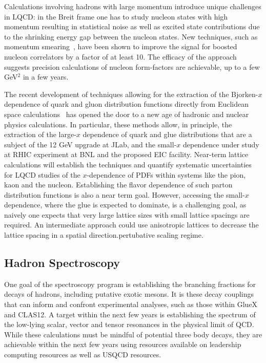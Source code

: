 Calculations involving hadrons with large momentum introduce unique challenges in LQCD: in the Breit frame one 
has to study nucleon states with high momentum 
resulting in statistical noise as well as excited state contributions due to the
shrinking energy gap between the nucleon states.
New techniques, such as momentum smearing~\cite{Bali:2016lva,Syritsyn:2017jrc}, have been shown to improve
the signal for boosted nucleon correlators by a factor of at least 10. The efficacy of the approach suggests precision calculations of nucleon form-factors are achievable, up to a few GeV$^2$ in a few years.

The recent development of techniques allowing for the extraction of the Bjorken-$x$ dependence of quark and gluon distribution functions directly from Euclidean space calculations~\cite{Ji:2001wha} has opened the door to a new age of hadronic and nuclear physics calculations. In particular, these methods allow, in principle,  the extraction of the large-$x$ dependence of quark and glue distributions that are a subject of the 12 GeV upgrade at JLab, and the small-$x$ dependence under study at RHIC experiment at BNL and the proposed EIC facility. Near-term  lattice calculations will establish the techniques and quantify systematic uncertainties for LQCD studies of the $x$-dependence of PDFs within systems like the pion, kaon and the nucleon. Establishing the flavor dependence of such parton distribution functions is also a near term goal. However, accessing the small-$x$ dependence, where the glue is expected to dominate, is a challenging goal, as naively one expects that very large lattice sizes with small lattice spacings are required. An intermediate approach could use anisotropic lattices to decrease the lattice spacing in a spatial direction.pertubative scaling regime.



\subsection{Hadron Spectroscopy}

One goal of the spectroscopy program is establishing the branching fractions for decays of hadrons, including putative exotic mesons. It is these decay couplings that can inform and confront experimental analyses, such as those within GlueX and CLAS12. A target within the next few years is establishing the spectrum of the low-lying scalar, vector and tensor resonances in the physical limit of QCD. While these calculations must be mindful of potential three body decays, they are achievable within the next few years using resources available on leadership computing resources as well as USQCD resources.

